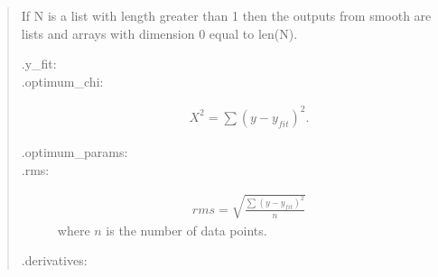 \documentclass[letterpaper,10pt,english]{sphinxmanual}
\begin{document}
\begin{fulllineitems}
\begin{quote}
\begin{description}
\end{description}
\end{quote}

\begin{quote}

If N is a list with length greater than 1 then the outputs from smooth
are lists and arrays with dimension 0 equal to len(N).
\begin{description}
\item[{.y\_fit: }] \leavevmode
{}

\item[{.optimum\_chi: }] \leavevmode
{}
\begin{equation*}
\begin{split}{X^2=\sum(y-y_{fit})^2}.\end{split}
\end{equation*}
\item[{.optimum\_params: }] \leavevmode
{}

\item[{.rms: }] \leavevmode
{}
\begin{equation*}
\begin{split}{rms=\sqrt{\frac{\sum(y-y_{fit})^2}{n}}}\end{split}
\end{equation*}
where \(n\) is the number of data points.

\item[{.derivatives: }] \leavevmode
{}


\end{description}
\end{quote}
\end{fulllineitems}
\end{document}

